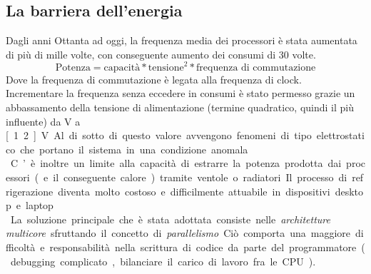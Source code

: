 \subsection{La barriera dell'energia}
Dagli anni Ottanta ad oggi, la frequenza media dei processori è stata aumentata di più di mille volte, con conseguente aumento dei consumi di 30 volte.
\begin{equation*}
\text{Potenza} = \text{capacità}*\text{tensione}^2*\text{frequenza di commutazione}
\end{equation*}
Dove la frequenza di commutazione è legata alla frequenza di clock.\\
Incrementare la frequenza senza eccedere in consumi è stato permesso grazie un abbassamento della tensione di alimentazione (termine quadratico, quindi il più influente) da \unit[5]{V} a \unit[1.2]{V}. Al di sotto di questo valore avvengono fenomeni di tipo elettrostatico che portano il sistema in una condizione anomala.\\
C’è inoltre un limite alla capacità di estrarre la potenza prodotta dai processori (e il conseguente calore) tramite ventole o radiatori. Il processo di refrigerazione diventa molto
costoso e difficilmente attuabile in dispositivi desktop e laptop.\\

La soluzione principale che è stata adottata consiste nelle \textit{architetture multicore} sfruttando il concetto di \textit{parallelismo}. Ciò comporta una maggiore difficoltà e responsabilità nella scrittura di codice da parte del programmatore (debugging complicato, bilanciare il carico di lavoro fra le CPU).




